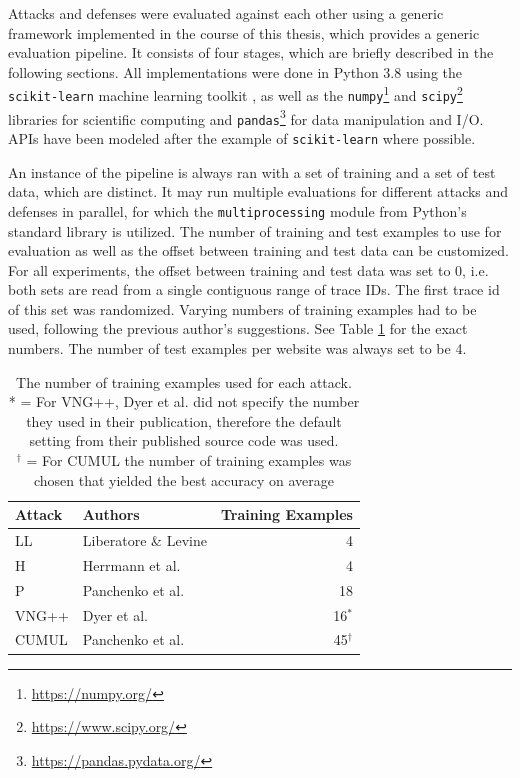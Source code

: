 \documentclass[
	ruledheaders=chapter,
	class=report,
	thesis={type=master, department=inf},
	accentcolor=1c,
	custommargins=true,
	marginpar=false,
	parskip=half-,
	fontsize=11pt,
]{tudapub}
\begin{document}
	Attacks and defenses were evaluated against each other using a generic framework implemented in the course of this thesis, which provides a generic evaluation pipeline. It consists of four stages, which are briefly described in the following sections. All implementations were done in Python 3.8 using the \texttt{scikit-learn} machine learning toolkit \cite{Pedregosa2011}, as well as the \texttt{numpy}\footnote{\url{https://numpy.org/}} \cite{Harris2020} and \texttt{scipy}\footnote{\url{https://www.scipy.org/}} \cite{Virtanen2020} libraries for scientific computing and \texttt{pandas}\footnote{\url{https://pandas.pydata.org/}} \cite{McKinney2010,Reback2021} for data manipulation and I/O. APIs have been modeled after the example of \texttt{scikit-learn} \cite{Buitinck2013} where possible.
	
	An instance of the pipeline is always ran with a set of training and a set of test data, which are distinct. It may run multiple evaluations for different attacks and defenses in parallel, for which the \texttt{multiprocessing} module from Python's standard library is utilized. The number of training and test examples to use for evaluation as well as the offset between training and test data can be customized. For all experiments, the offset between training and test data was set to 0, i.e. both sets are read from a single contiguous range of trace IDs. The first trace id of this set was randomized. Varying numbers of training examples had to be used, following the previous author's suggestions. See Table \ref{tbl:train} for the exact numbers. The number of test examples per website was always set to be 4.
	
	\begin{table}
		\centering
		\begin{tabularx}{0.85\textwidth}{lXr}
			\toprule \textbf{Attack} & \textbf{Authors} & \textbf{Training Examples} \\
			\midrule LL & Liberatore \& Levine \cite{Liberatore2006} & 4 \\
			H & Herrmann et al. \cite{Herrmann2009} & 4 \\
			P & Panchenko et al. \cite{Panchenko2011} & 18\\
			VNG++ & Dyer et al. \cite{Dyer2012} & 16${}^*$\\
			CUMUL & Panchenko et al. \cite{Panchenko2016} & 45${}^\dagger$\\
			\bottomrule
		\end{tabularx}
		\caption[The number of training examples used for each attack]{The number of training examples used for each attack.\\{*} = For VNG++, Dyer et al. did not specify the number they used in their publication, therefore the default setting from their published source code was used.\\{${}^\dagger$} = For CUMUL the number of training examples was chosen that yielded the best accuracy on average}
		\label{tbl:train}
	\end{table}
	
\end{document}
